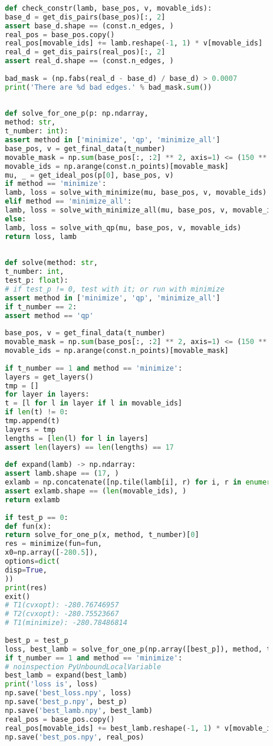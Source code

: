 \documentclass[withoutpreface,bwprint,fontset=macnew]{cumcmthesis} %
\begin{document}
\begin{appendices}
\begin{lstlisting}[language=python]
		
		def check_constr(lamb, base_pos, v, movable_ids):
		base_d = get_dis_pairs(base_pos)[:, 2]
		assert base_d.shape == (const.n_edges, )
		real_pos = base_pos.copy()
		real_pos[movable_ids] += lamb.reshape(-1, 1) * v[movable_ids]
		real_d = get_dis_pairs(real_pos)[:, 2]
		assert real_d.shape == (const.n_edges, )
		
		bad_mask = (np.fabs(real_d - base_d) / base_d) > 0.0007
		print('There are %d bad edges.' % bad_mask.sum())
		
		
		def solve_for_one_p(p: np.ndarray,
		method: str,
		t_number: int):
		assert method in ['minimize', 'qp', 'minimize_all']
		base_pos, v = get_final_data(t_number)
		movable_mask = np.sum(base_pos[:, :2] ** 2, axis=1) <= (150 ** 2)
		movable_ids = np.arange(const.n_points)[movable_mask]
		mu, _ = get_ideal_pos(p[0], base_pos, v)
		if method == 'minimize':
		lamb, loss = solve_with_minimize(mu, base_pos, v, movable_ids)
		elif method == 'minimize_all':
		lamb, loss = solve_with_minimize_all(mu, base_pos, v, movable_ids)
		else:
		lamb, loss = solve_with_qp(mu, base_pos, v, movable_ids)
		return loss, lamb
		
		
		def solve(method: str,
		t_number: int,
		test_p: float):
		# if test_p != 0, test with it; or run with minimize
		assert method in ['minimize', 'qp', 'minimize_all']
		if t_number == 2:
		assert method == 'qp'
		
		base_pos, v = get_final_data(t_number)
		movable_mask = np.sum(base_pos[:, :2] ** 2, axis=1) <= (150 ** 2)
		movable_ids = np.arange(const.n_points)[movable_mask]
		
		if t_number == 1 and method == 'minimize':
		layers = get_layers()
		tmp = []
		for layer in layers:
		t = [l for l in layer if l in movable_ids]
		if len(t) != 0:
		tmp.append(t)
		layers = tmp
		lengths = [len(l) for l in layers]
		assert len(layers) == len(lengths) == 17
		
		def expand(lamb) -> np.ndarray:
		assert lamb.shape == (17, )
		exlamb = np.concatenate([np.tile(lamb[i], r) for i, r in enumerate([len(l) for l in layers])])
		assert exlamb.shape == (len(movable_ids), )
		return exlamb
		
		if test_p == 0:
		def fun(x):
		return solve_for_one_p(x, method, t_number)[0]
		res = minimize(fun=fun,
		x0=np.array([-280.5]),
		options=dict(
		disp=True,
		))
		print(res)
		exit()
		# T1(cvxopt): -280.76746957
		# T2(cvxopt): -280.75523667
		# T1(minimize): -280.78486814
		
		best_p = test_p
		loss, best_lamb = solve_for_one_p(np.array([best_p]), method, t_number)
		if t_number == 1 and method == 'minimize':
		# noinspection PyUnboundLocalVariable
		best_lamb = expand(best_lamb)
		print('loss is', loss)
		np.save('best_loss.npy', loss)
		np.save('best_p.npy', best_p)
		np.save('best_lamb.npy', best_lamb)
		real_pos = base_pos.copy()
		real_pos[movable_ids] += best_lamb.reshape(-1, 1) * v[movable_ids]
		np.save('best_pos.npy', real_pos)
		

\end{lstlisting}
\end{appendices}
\end{document}
